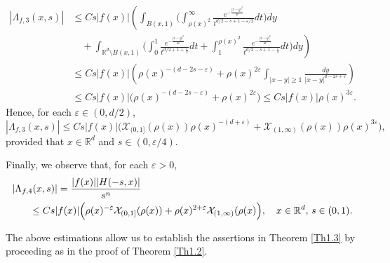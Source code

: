 \documentclass[10pt, a4paper, reqno]{amsart}
\theoremstyle{definition}
\theoremstyle{remark}
\numberwithin{equation}{section}
\begin{document}
\begin{align*}
    |\Lambda_{f,3}(x,s)|&\leq Cs|f(x)|\left(\int_{B(x,1)}\Big(\int_{\rho (x)^2}^\infty \frac{e^{-\frac{|x-y|^2}{4t}}}{t^{d/2-s+1-\varepsilon /2}}dt\Big)dy\right.\\
    &\left.\quad +\int_{\mathbb R^d\setminus B(x,1)}\Big(\int_0^1\frac{e^{-\frac{|x-y|^2}{4t}}}{t^{d/2+1+\tfrac{\varepsilon}{2}}}dt+\int_1^{\rho (x)^2}\frac{e^{-\frac{|x-y|^2}{4t}}}{t^{d/2-s+1-\tfrac{\varepsilon}{2}}}dt\Big)dy\right)\\
    &\leq Cs|f(x)|\left(\rho (x)^{-(d-2s-\varepsilon)}+\rho(x)^{2\varepsilon}\int_{|x-y|\geq 1}\frac{dy}{|x-y|^{d-2s+\varepsilon}}\right)\\
    &\leq Cs|f(x)|\Big(\rho (x)^{-(d-2s-\varepsilon)}+\rho(x)^{2\varepsilon}\Big)\leq Cs|f(x)|\rho (x)^{3\varepsilon}. 
\end{align*}
Hence, for each $\varepsilon \in (0,d/2)$, 
\[
|\Lambda _{f,3}(x,s)|\leq Cs|f(x)|\big(\mathcal X_{(0,1]}(\rho (x))\rho (x)^{-(d+\varepsilon)}+\mathcal X_{(1,\infty )}(\rho (x))\rho (x)^{3\varepsilon}\big),
\]
provided that $x\in \mathbb R^d$ and $s\in (0,\varepsilon /4)$.


Finally, we observe that, for each $\varepsilon >0$,
\begin{align*}
|\Lambda _{f,4}(x,s)|&=\frac{|f(x)||H(-s,x)|}{s^n}\\
&\hspace{-1cm}\leq Cs|f(x)|\Big(\rho (x)^{-\varepsilon}\mathcal X_{(0,1]}(\rho (x))+\rho (x)^{2+\varepsilon}\mathcal X_{(1,\infty )}(\rho (x)\Big),\quad x\in \mathbb R^d,\,s\in (0,1).
\end{align*}

The above estimations allow us to establish the assertions in Theorem \ref{Th1.3} by proceeding as in the proof of Theorem \ref{Th1.2}.




\end{document}
